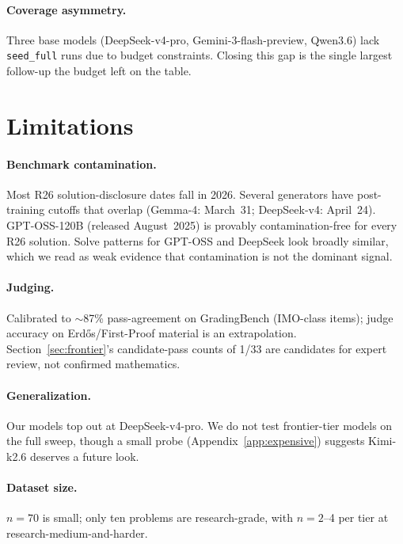 \documentclass{article}
\begin{document}
\paragraph{Coverage asymmetry.}
Three base models (DeepSeek-v4-pro, Gemini-3-flash-preview, Qwen3.6) lack
\texttt{seed\_full} runs due to budget constraints.
Closing this gap is the single largest follow-up the budget left on the table.

\section{Limitations}
\label{sec:limitations}

\paragraph{Benchmark contamination.}
Most R26 solution-disclosure dates fall in 2026.
Several generators have post-training cutoffs that overlap (Gemma-4: March~31;
DeepSeek-v4: April~24).
GPT-OSS-120B (released August~2025) is provably contamination-free for every R26
solution.
Solve patterns for GPT-OSS and DeepSeek look broadly similar, which we read as
weak evidence that contamination is not the dominant signal.

\paragraph{Judging.}
Calibrated to $\sim$87\% pass-agreement on GradingBench (IMO-class items); judge
accuracy on Erd\H{o}s/First-Proof material is an extrapolation.
Section~\ref{sec:frontier}'s candidate-pass counts of 1/33 are candidates for
expert review, not confirmed mathematics.

\paragraph{Generalization.}
Our models top out at DeepSeek-v4-pro.
We do not test frontier-tier models on the full sweep, though a small probe
(Appendix~\ref{app:expensive}) suggests Kimi-k2.6 deserves a future look.

\paragraph{Dataset size.}
$n{=}70$ is small; only ten problems are research-grade, with $n{=}2$--4 per tier
at research-medium-and-harder.
\end{document}
